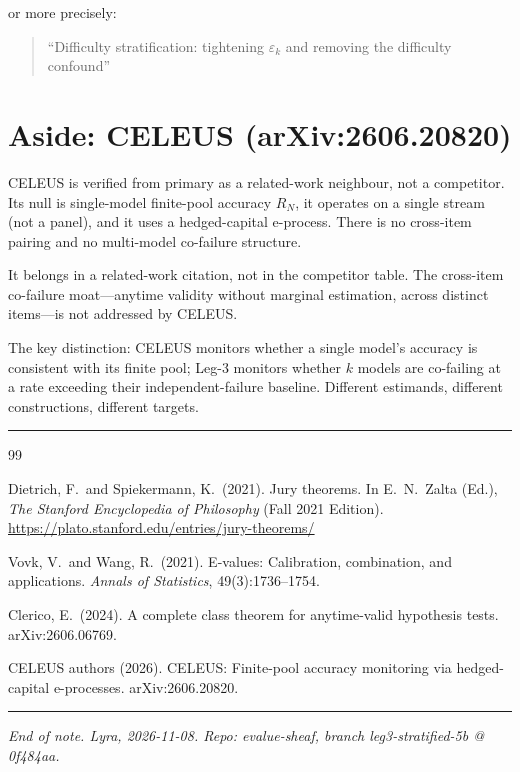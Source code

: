 \documentclass[11pt,a4paper]{article}
\begin{document}
or more precisely:
\begin{quote}
``Difficulty stratification: tightening $\varepsilon_k$ and removing
the difficulty confound''
\end{quote}

\section{Aside: CELEUS (arXiv:2606.20820)}

CELEUS is verified from primary as a related-work neighbour, not a
competitor.  Its null is single-model finite-pool accuracy $R_N$,
it operates on a single stream (not a panel), and it uses a
hedged-capital e-process.  There is no cross-item pairing and no
multi-model co-failure structure.

It belongs in a related-work citation, not in the competitor table.
The cross-item co-failure moat---anytime validity without marginal
estimation, across distinct items---is not addressed by CELEUS.

The key distinction: CELEUS monitors whether a single model's accuracy
is consistent with its finite pool; Leg-3 monitors whether $k$ models
are co-failing at a rate exceeding their independent-failure baseline.
Different estimands, different constructions, different targets.

\bigskip
\noindent\rule{\textwidth}{0.4pt}

\begin{thebibliography}{99}

Dietrich, F.\ and Spiekermann, K.\ (2021).
\newblock Jury theorems.
\newblock In E.~N.~Zalta (Ed.), \emph{The Stanford Encyclopedia of
  Philosophy} (Fall 2021 Edition).
\newblock \url{https://plato.stanford.edu/entries/jury-theorems/}

Vovk, V.\ and Wang, R.\ (2021).
\newblock E-values: Calibration, combination, and applications.
\newblock \emph{Annals of Statistics}, 49(3):1736--1754.

Clerico, E.\ (2024).
\newblock A complete class theorem for anytime-valid hypothesis tests.
\newblock arXiv:2606.06769.

CELEUS authors (2026).
\newblock CELEUS: Finite-pool accuracy monitoring via hedged-capital
  e-processes.
\newblock arXiv:2606.20820.

\end{thebibliography}

\bigskip
\noindent\rule{\textwidth}{0.4pt}
\begin{center}
\small\textit{End of note. Lyra, 2026-11-08.
Repo: evalue-sheaf, branch leg3-stratified-5b @ 0f484aa.}
\end{center}
\end{document}
